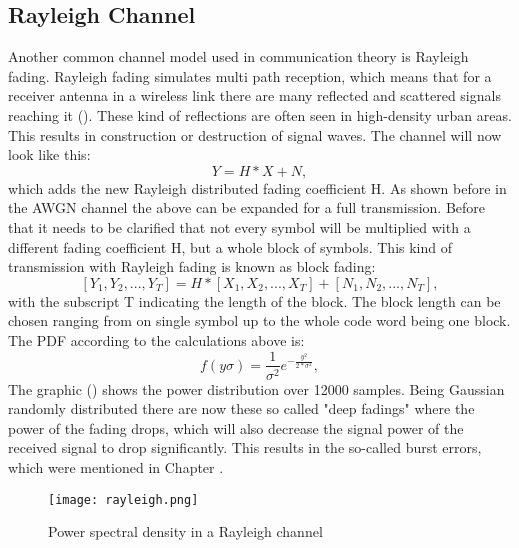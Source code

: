 \subsection{Rayleigh Channel}
\label{sec:rayleigh}
Another common channel model used in communication theory is Rayleigh fading. Rayleigh fading simulates multi path reception, which means that for a receiver antenna in a wireless link there are many reflected and scattered signals reaching it (). These kind of reflections are often seen in high-density urban areas. This results in construction or destruction of signal waves. The channel will now look like this:
\begin{equation}
\label{eq:rayleigh1}
Y = H * X + N,  
\end{equation}
which adds the new Rayleigh distributed fading coefficient H.
\newline
As shown before in the \gls{AWGN} channel the above  can be expanded for a full transmission. Before that it needs to be clarified that not every symbol will be multiplied with a different fading coefficient H, but a whole block of symbols. This kind of transmission with Rayleigh fading is known as block fading:
\begin{equation}
\label{eq:rayleigh2}
[Y_1,Y_2,...,Y_T] = H * [X_1,X_2,...,X_T] + [N_1,N_2,...,N_T],  
\end{equation}
with the subscript T indicating the length of the block. The block length can be chosen ranging from on single symbol up to the whole code word being one block. 
The PDF according to the calculations above is:
\begin{equation}
\label{eq:raypdf}
f(y\sigma) = \frac{1}{\sigma^2}e^{-\frac{y^2}{2*\sigma^2}},
\end{equation}
\newline
The graphic () shows the power distribution over 12000 samples. Being Gaussian randomly distributed there are now these so called "deep fadings" where the power of the fading drops, which will also decrease the signal power of the received signal to drop significantly. This results in the so-called burst errors, which were mentioned in Chapter .


\begin{figure}[!htb]
	\centering
	\texttt{[image: rayleigh.png]}
	\caption{Power spectral density in a Rayleigh channel}
	\label{fig:rayleigh}
\end{figure}